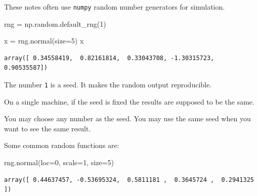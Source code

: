 \documentclass[
  letterpaper,
  DIV=11,
  numbers=noendperiod]{scrreprt}
\newenvironment{Shaded}{\begin{snugshade}}{\end{snugshade}}
\newcommand{\DecValTok}[1]{\textcolor[rgb]{0.68,0.00,0.00}{#1}}
\newcommand{\NormalTok}[1]{\textcolor[rgb]{0.00,0.23,0.31}{#1}}
\newcommand{\OperatorTok}[1]{\textcolor[rgb]{0.37,0.37,0.37}{#1}}
\theoremstyle{definition}
\theoremstyle{definition}
\theoremstyle{plain}
\theoremstyle{plain}
\theoremstyle{remark}
\begin{document}
These notes often use \texttt{numpy} random number generators for
simulation.

\begin{Shaded}
\begin{Highlighting}[]
\NormalTok{rng }\OperatorTok{=}\NormalTok{ np.random.default\_rng(}\DecValTok{1}\NormalTok{)}

\NormalTok{x }\OperatorTok{=}\NormalTok{ rng.normal(size}\OperatorTok{=}\DecValTok{5}\NormalTok{)}
\NormalTok{x}
\end{Highlighting}
\end{Shaded}

\begin{verbatim}
array([ 0.34558419,  0.82161814,  0.33043708, -1.30315723,  0.90535587])
\end{verbatim}

\begin{tcolorbox}[enhanced jigsaw, arc=.35mm, bottomrule=.15mm, bottomtitle=1mm, breakable, colback=white, colbacktitle=quarto-callout-note-color!10!white, colframe=quarto-callout-note-color-frame, coltitle=black, left=2mm, leftrule=.75mm, opacityback=0, opacitybacktitle=0.6, rightrule=.15mm, title=\textcolor{quarto-callout-note-color}{\faInfo}\hspace{0.5em}{Note}, titlerule=0mm, toprule=.15mm, toptitle=1mm]

The number \texttt{1} is a seed. It makes the random output
reproducible.

On a single machine, if the seed is fixed the results are supposed to be
the same.

You may choose any number as the seed. You may use the same seed when
you want to see the same result.

\end{tcolorbox}

Some common random functions are:

\begin{Shaded}
\begin{Highlighting}[]
\NormalTok{rng.normal(loc}\OperatorTok{=}\DecValTok{0}\NormalTok{, scale}\OperatorTok{=}\DecValTok{1}\NormalTok{, size}\OperatorTok{=}\DecValTok{5}\NormalTok{)}
\end{Highlighting}
\end{Shaded}

\begin{verbatim}
array([ 0.44637457, -0.53695324,  0.5811181 ,  0.3645724 ,  0.2941325 ])
\end{verbatim}
\end{document}
